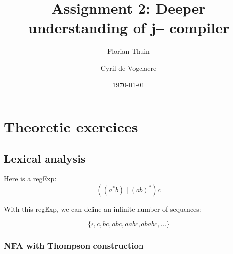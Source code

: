 \documentclass[a4paper, 11pt]{article}
\author{Florian Thuin \and Cyril de Vogelaere}
\date{\today}
\title{Assignment 2: Deeper understanding of j-- compiler}
\begin{document}
    \maketitle
    \tableofcontents

	\section{Theoretic exercices}
    \subsection{Lexical analysis}
    Here is a regExp:
    $$ ((a^{*}b) \mid {(ab)}^{*})c $$

    With this regExp, we can define an infinite number of sequences:

    $$ \{ \epsilon, c, bc, abc, aabc, ababc, \ldots \} $$

    \subsubsection{NFA with Thompson construction}
\end{document}

